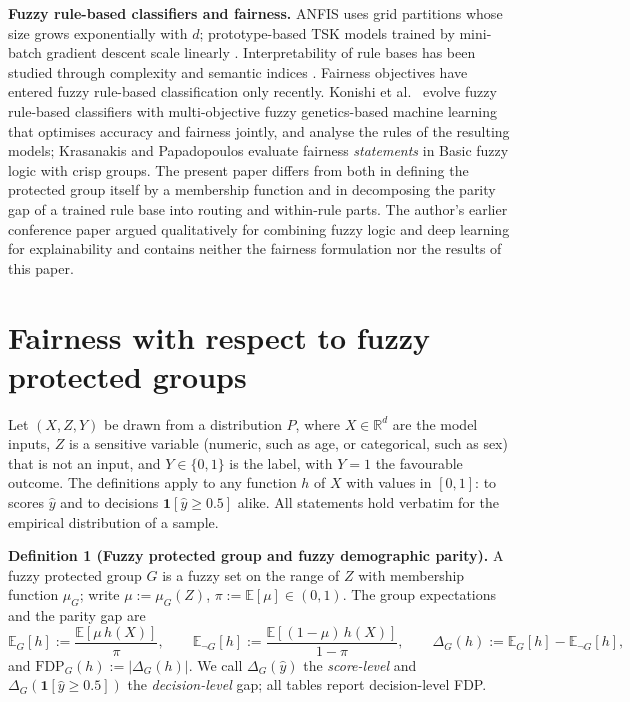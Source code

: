 \textbf{Fuzzy rule-based classifiers and fairness.} ANFIS \cite{anfis} uses grid partitions whose size grows exponentially with \(d\); prototype-based TSK models trained by mini-batch gradient descent scale linearly \cite{mbgd,htsk,zhou,talpur}. Interpretability of rule bases has been studied through complexity and semantic indices \cite{gacto2011,guillaume,gacto2010,alonso}. Fairness objectives have entered fuzzy rule-based classification only recently. Konishi et al.~\cite{konishi} evolve fuzzy rule-based classifiers with multi-objective fuzzy genetics-based machine learning that optimises accuracy and fairness jointly, and analyse the rules of the resulting models; Krasanakis and Papadopoulos \cite{krasanakis} evaluate fairness \emph{statements} in Basic fuzzy logic with crisp groups. The present paper differs from both in defining the protected group itself by a membership function and in decomposing the parity gap of a trained rule base into routing and within-rule parts. The author's earlier conference paper \cite{imam} argued qualitatively for combining fuzzy logic and deep learning for explainability and contains neither the fairness formulation nor the results of this paper.

\hypertarget{fairness-with-respect-to-fuzzy-protected-groups}{%
\section{Fairness with respect to fuzzy protected groups}\label{fairness-with-respect-to-fuzzy-protected-groups}}

Let \((X,Z,Y)\) be drawn from a distribution \(P\), where \(X \in \mathbb{R}^{d}\) are the model inputs, \(Z\) is a sensitive variable (numeric, such as age, or categorical, such as sex) that is not an input, and \(Y \in \{0,1\}\) is the label, with \(Y = 1\) the favourable outcome. The definitions apply to any function \(h\) of \(X\) with values in \([0,1]\): to scores \(\hat y\) and to decisions \(\mathbf{1}[\hat{y} \geq 0.5]\) alike. All statements hold verbatim for the empirical distribution of a sample.

\textbf{Definition 1 (Fuzzy protected group and fuzzy demographic parity).} A fuzzy protected group \(G\) is a fuzzy set on the range of \(Z\) with membership function \(\mu_G\); write \(\mu := \mu_G(Z)\), \(\pi := \mathbb{E}[\mu] \in (0,1)\). The group expectations and the parity gap are \[\mathbb{E}_{G}[h] := \frac{\mathbb{E}[\mu\, h(X)]}{\pi},\qquad \mathbb{E}_{\neg G}[h] := \frac{\mathbb{E}[(1 - \mu)\, h(X)]}{1 - \pi},\qquad \Delta_{G}(h) := \mathbb{E}_{G}[h] - \mathbb{E}_{\neg G}[h], \tag{1}\] and \(\mathrm{FDP}_{G}(h) := |\Delta_{G}(h)|\). We call \(\Delta_G(\hat y)\) the \emph{score-level} and \(\Delta_G(\mathbf{1}[\hat{y} \geq 0.5])\) the \emph{decision-level} gap; all tables report decision-level FDP.

